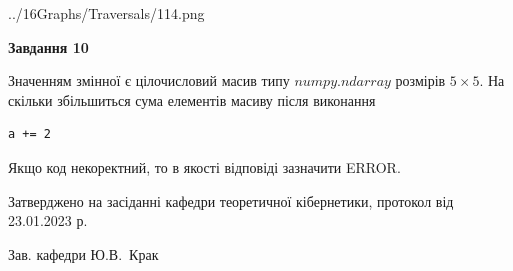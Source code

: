 \documentclass[12pt, ukrainian]{article}
\begin{document}
{\begin {large}
\begin{center}
	{../16Graphs/Traversals/114.png}
\end{center}\par
\newpage

{\begin {center}\textbf{Завдання 10}\end {center}}\par
Значенням змінної  є цілочисловий масив типу $numpy.ndarray$ розмірів $5{\times}5$. На скільки збільшиться сума елементів масиву  після виконання
\begin{verbatim}
a += 2
\end{verbatim}


Якщо код некоректний, то в якості відповіді зазначити ERROR.\par
\newpage


\end {large}
}
{\smallskip \begin {small} Затверджено на засіданні кафедри теоретичної кібернетики, протокол  від   23.01.2023 р.\par\smallskip\smallskip
{\parbox {6.5 cm}{Зав. кафедри \dotfill Ю.В.~Крак}} \end{small}}
\end{document}
